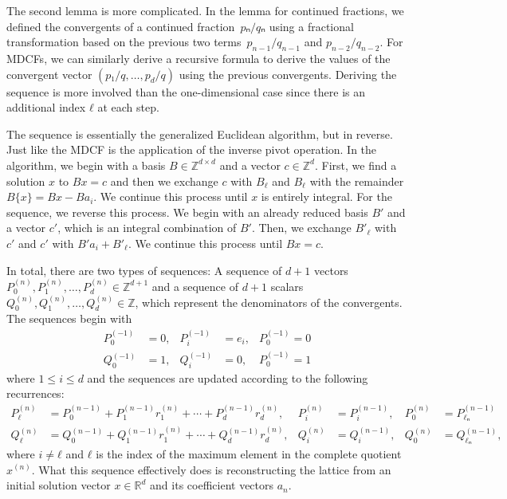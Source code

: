 The second lemma is more complicated.
In the lemma for continued fractions,
we defined the convergents of a continued fraction~$pₙ/qₙ$
using a fractional transformation based on the previous two
terms~$p_{n-1}/q_{n-1}$ and $p_{n-2}/q_{n-2}$.
For MDCFs, we can similarly derive a recursive formula to derive the values of
the convergent vector $(p₁/q, \dots, p_d/q)$ using the previous convergents.
Deriving the sequence is more involved than the one-dimensional case since
there is an additional index $ℓ$ at each step.

The sequence is essentially the generalized Euclidean algorithm, but in reverse.
Just like the MDCF is the application of the inverse pivot operation.
In the algorithm, we begin with a basis $B ∈ ℤ^{d×d}$ and a vector $c ∈ ℤ^d$.
First, we find a solution $x$ to $Bx = c$ and then we exchange $c$ with $B_ℓ$
and $B_ℓ$ with the remainder $B\{x\} = Bx - Ba_i$.
We continue this process until $x$ is entirely integral.
For the sequence, we reverse this process.
We begin with an already reduced basis $B'$ and a vector $c'$, which is an
integral combination of $B'$.
Then, we exchange $B'_{ℓ}$ with $c'$ and $c'$ with $B' a_i + B'_{ℓ}$.
We continue this process until $B x = c$.

In total, there are two types of sequences:
A sequence of $d+1$ vectors $P_0^{(n)}, P_1^{(n)}, …, P_d^{(n)} ∈ ℤ^{d+1}$ and a sequence
of $d+1$ scalars $Q_0^{(n)}, Q_1^{(n)}, …, Q_d^{(n)} ∈ ℤ$,
which represent the denominators of the convergents.
The sequences begin with
\begin{align*}
  P_0^{(-1)} & = 0, & P_i^{(-1)} & = e_i, & P_0^{(-1)} = 0 \\
  Q_0^{(-1)} & = 1, & Q_i^{(-1)} & = 0,   & P_0^{(-1)} = 1
\end{align*}
where $1 ≤ i ≤ d$ and the sequences are updated according to the following
recurrences:
\begin{align*}
  P_ℓ^{(n)} & = P_0^{(n-1)} + P_1^{(n-1)} r_1^{(n)} + ⋯ + P_d^{(n-1)} r_d^{(n)}, &
  P_i^{(n)} & = P_i^{(n-1)}, &
  P_0^{(n)} & = P_{ℓₙ}^{(n-1)} \\
  Q_ℓ^{(n)} & = Q_0^{(n-1)} + Q_1^{(n-1)} r_1^{(n)} + ⋯ + Q_d^{(n-1)} r_d^{(n)}, &
  Q_i^{(n)} & = Q_i^{(n-1)}, &
  Q_0^{(n)} & = Q_{ℓₙ}^{(n-1)},
\end{align*}
where $i ≠ ℓ$ and $ℓ$ is the index of the maximum element in the complete
quotient $x^{(n)}$. %
What this sequence effectively does is reconstructing the lattice from an
initial solution vector $x ∈ ℝ^d$ and its coefficient vectors $a_n$.

